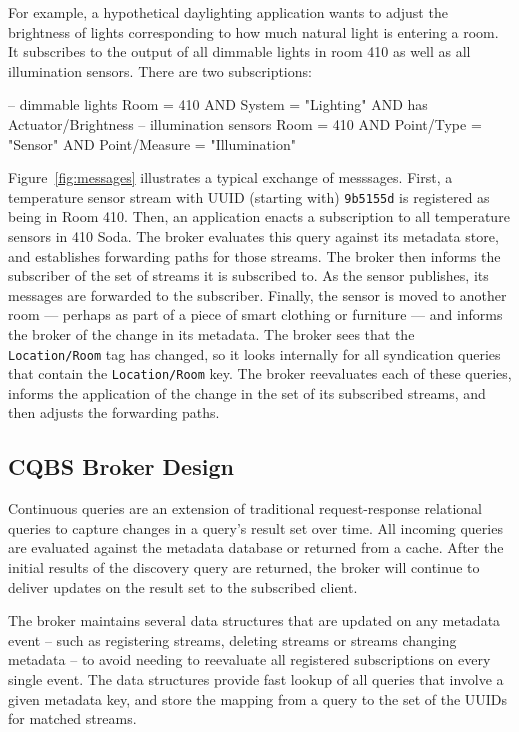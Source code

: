 For example, a hypothetical daylighting application wants to adjust the brightness of lights corresponding to how much natural light is entering a room.
It subscribes to the output of all dimmable lights in room 410 as well as all illumination sensors.
There are two subscriptions:

\begin{minipage}{\linewidth}
\begin{sqlcode}
-- dimmable lights
Room = 410 AND System = "Lighting"
AND has Actuator/Brightness
-- illumination sensors
Room = 410 AND Point/Type = "Sensor"
AND Point/Measure = "Illumination"
\end{sqlcode}
\end{minipage}
\vspace{0.3cm}

Figure~\ref{fig:messages} illustrates a typical exchange of messsages.
First, a temperature sensor stream with UUID (starting with) \texttt{9b5155d} is registered as being in Room 410.
Then, an application enacts a subscription to all temperature sensors in 410 Soda.
The broker evaluates this query against its metadata store, and establishes forwarding paths for those streams.
The broker then informs the subscriber of the set of streams it is subscribed to.
As the sensor publishes, its messages are forwarded to the subscriber.
Finally, the sensor is moved to another room --- perhaps as part of a piece of smart clothing or furniture --- and informs the broker of the change in its metadata.
The broker sees that the \texttt{Location/Room} tag has changed, so it looks internally for all syndication queries that contain the \texttt{Location/Room} key.
The broker reevaluates each of these queries, informs the application of the change in the set of its subscribed streams, and then adjusts the forwarding paths.

\subsection{CQBS Broker Design}

Continuous queries are an extension of traditional request-response relational queries to capture changes in a query's result set over time.
All incoming queries are evaluated against the metadata database or returned from a cache.
After the initial results of the discovery query are returned, the broker will continue to deliver updates on the result set to the subscribed client.

The broker maintains several data structures that are updated on any metadata event -- such as registering streams, deleting streams or streams changing metadata -- to avoid needing to reevaluate all registered subscriptions on every single event.
The data structures provide fast lookup of all queries that involve a given metadata key, and store the mapping from a query to the set of the UUIDs for matched streams.

